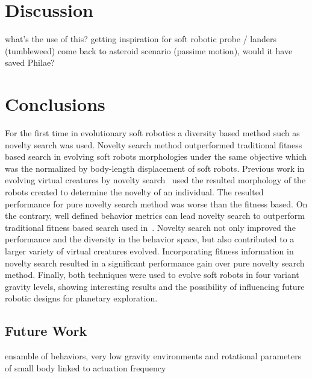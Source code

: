 \documentclass{sig-alternate}
\begin{document}
\section{Discussion}
what's the use of this?
getting inspiration for soft robotic probe / landers (tumbleweed)
come back to asteroid scenario (passime motion), would it have saved Philae?

\section{Conclusions}
For the first time in evolutionary soft robotics a diversity based method such as novelty search was used. Novelty search method outperformed traditional fitness based search in evolving soft robots morphologies under the same objective which was the normalized by body-length displacement of soft robots. Previous work in evolving virtual creatures by novelty search~\cite{lehman2011evolving} used the resulted morphology of the robots created to determine the novelty of an individual. The resulted performance for pure novelty search method was worse than the fitness based. On the contrary, well defined behavior metrics can lead novelty search to outperform traditional fitness based search used in~\cite{cheney2013unshackling}. Novelty search not only improved the performance and the diversity in the behavior space, but also contributed to a larger variety of virtual creatures evolved. Incorporating fitness information in novelty search resulted in a significant performance gain over pure novelty search method. Finally, both techniques were used to evolve soft robots in four variant gravity levels, showing interesting results and the possibility of influencing future robotic designs for planetary exploration.

\subsection{Future Work}
ensamble of behaviors, very low gravity environments and rotational parameters of small body linked to actuation frequency


\begingroup
{}


\endgroup
\end{document}
